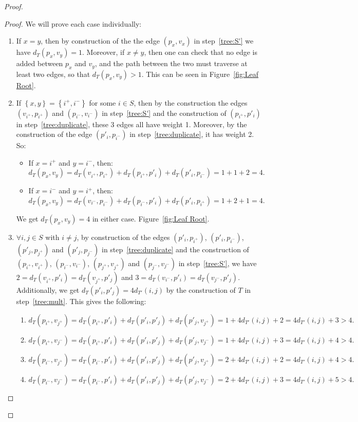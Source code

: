 \documentclass[11pt, letter]{article}
\theoremstyle{remark}
\newcommand{\set}[1]{\left\{#1\right\}}
\begin{document}
\begin{proof}
\begin{proof}
    We will prove each case individually:
    \begin{enumerate}
        \item If $x=y$, then by construction of the the edge $(p_x,v_x)$ in step~\ref{tree:S'} we have $d_{T}(p_x,v_y) = 1$.  Moreover, if $x \neq y$, then one can check that no edge is added between $p_x$ and $v_y$, and the path between the two must traverse at least two edges, so that $d_T(p_x, v_y) > 1$. This can be seen in Figure~\ref{fig:Leaf Root}.
        \item If $\set{x,y}=\set{i^+,i^-}$ for some $i\in S$, then by the construction the edges $(v_{i^+},p_{i^+})$ and $(p_{i^-},v_{i^-})$ in step~\ref{tree:S'} and the construction of $(p_{i^+},p'_{i})$ in step~\ref{tree:duplicate}, these 3 edges all have weight 1. Moreover, by the construction of the edge $(p'_{i},p_{i^-})$ in step~\ref{tree:duplicate}, it has weight 2. So:
        \begin{itemize}
            \item If $x=i^+$ and $y=i^-$, then:
            \[d_{T}(p_x,v_y)=d_{T}(v_{i^+},p_{i^+})+d_{T}(p_{i^+},p'_{i})+d_{T}(p'_{i},p_{i^-})=1+1+2=4.\]
            \item If $x=i^-$ and $y=i^+$, then:
            \[d_{T}(p_x,v_y)=d_{T}(v_{i^-},p_{i^-})+d_{T}(p_{i^-},p'_{i})+d_{T}(p'_{i},p_{i^+})=1+2+1=4.\]
        \end{itemize}
        We get $d_{T}(p_x,v_y)=4$ in either case. Figure~\ref{fig:Leaf Root}.
        \item $\forall i,j\in S$ with $i \neq j$, by construction of the edges $(p'_i,p_{i^+})$, $(p'_i,p_{i^-})$, $(p'_j,p_{j^+})$ and $(p'_j,p_{j^-})$ in step~\ref{tree:duplicate} and the construction of $(p_{i^+},v_{i^+})$, $(p_{i^-},v_{i^-})$, $(p_{j^+},v_{j^+})$ and $(p_{j^-},v_{j^-})$ in step~\ref{tree:S'}, we have $2=d_{T}(v_{i^+},p'_{i})=d_{T}(v_{j^+},p'_{j})$ and $3=d_{T}(v_{i^-},p'_{i})=d_{T}(v_{j^-},p'_{j})$. Additionally, we get $d_{T}(p'_{i},p'_{j})=4 d_{T'}(i,j)$ by the construction of $T$ in step~\ref{tree:mult}. This gives the following:
        \begin{enumerate}
            \item $d_{T}(p_{i^+},v_{j^+})=d_{T}(p_{i^+},p'_{i})+d_{T}(p'_{i},p'_{j})+d_{T}(p'_{j},v_{j^+})=1+4d_{T'}(i,j)+2 =4d_{T'}(i,j)+3 >4.$
            \item $d_{T}(p_{i^+},v_{j^-})=d_{T}(p_{i^+},p'_{i})+d_{T}(p'_{i},p'_{j})+d_{T}(p'_{j},v_{j^-})=1+4d_{T'}(i,j)+3 =4d_{T'}(i,j)+4 >4.$
            \item $d_{T}(p_{i^-},v_{j^+})=d_{T}(p_{i^-},p'_{i})+d_{T}(p'_{i},p'_{j})+d_{T}(p'_{j},v_{j^+})=2+4d_{T'}(i,j)+2 =4d_{T'}(i,j)+4 >4.$
            \item $d_{T}(p_{i^-},v_{j^-})=d_{T}(p_{i^-},p'_{i})+d_{T}(p'_{i},p'_{j})+d_{T}(p'_{j},v_{j^-})=2+4d_{T'}(i,j)+3 =4d_{T'}(i,j)+5 >4.$
        \end{enumerate}
    \end{enumerate}
\end{proof}


\end{proof}
\end{document}
